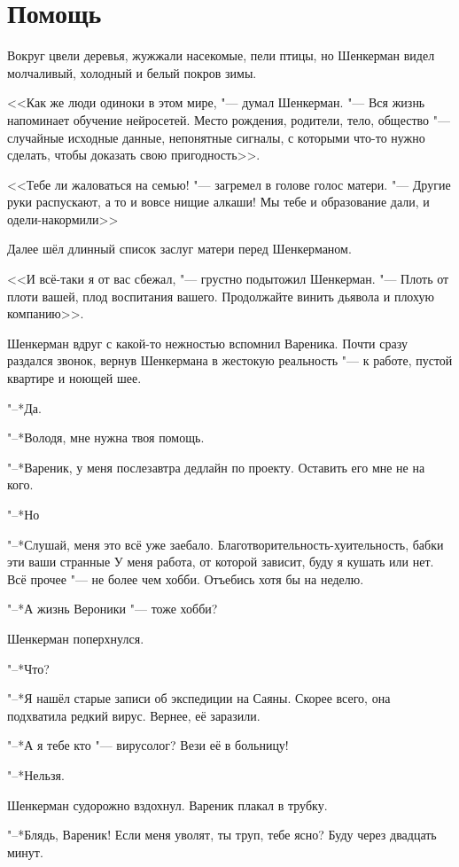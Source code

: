 \section{Помощь}

Вокруг цвели деревья, жужжали насекомые, пели птицы, но Шенкерман видел молчаливый, холодный и белый покров зимы.

<<Как же люди одиноки в этом мире, "--- думал Шенкерман.
"--- Вся жизнь напоминает обучение нейросетей.
Место рождения, родители, тело, общество "--- случайные исходные данные, непонятные сигналы, с которыми что-то нужно сделать, чтобы доказать свою пригодность>>.

<<Тебе ли жаловаться на семью! "--- загремел в голове голос матери.
"--- Другие руки распускают, а то и вовсе нищие алкаши!
Мы тебе и образование дали, и одели-накормили\ldotse>>

Далее шёл длинный список заслуг матери перед Шенкерманом.

<<И всё-таки я от вас сбежал, "--- грустно подытожил Шенкерман.
"--- Плоть от плоти вашей, плод воспитания вашего.
Продолжайте винить дьявола и плохую компанию>>.

Шенкерман вдруг с какой-то нежностью вспомнил Вареника.
Почти сразу раздался звонок, вернув Шенкермана в жестокую реальность "--- к работе, пустой квартире и ноющей шее.

"--*Да.

"--*Володя, мне нужна твоя помощь.

"--*Вареник, у меня послезавтра дедлайн по проекту.
Оставить его мне не на кого.

"--*Но\ldotst

"--*Слушай, меня это всё уже заебало.
Благотворительность-хуительность, бабки эти ваши странные\ldotst
У меня работа, от которой зависит, буду я кушать или нет.
Всё прочее "--- не более чем хобби.
Отъебись хотя бы на неделю.

"--*А жизнь Вероники "--- тоже хобби?

Шенкерман поперхнулся.

"--*Что?

"--*Я нашёл старые записи об экспедиции на Саяны.
Скорее всего, она подхватила редкий вирус.
Вернее, её заразили.

"--*А я тебе кто "--- вирусолог?
Вези её в больницу!

"--*Нельзя.

Шенкерман судорожно вздохнул.
Вареник плакал в трубку.

"--*Блядь, Вареник!
Если меня уволят, ты труп, тебе ясно?
Буду через двадцать минут.

